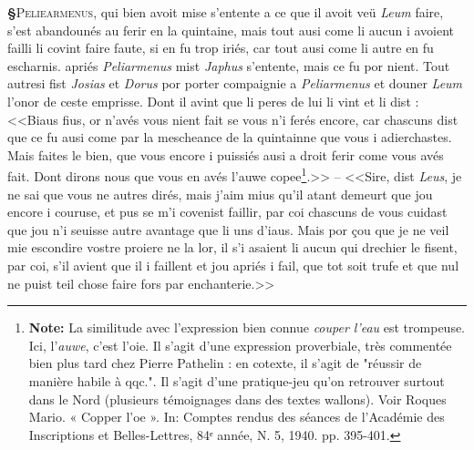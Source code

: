 \documentclass[12pt]{article} %
\newcommand{\persName}[1]{\emph{#1}} %
\newcommand{\supplied}[1]{\textlangle#1\textrangle} %
\newcommand{\fnnote}[1]{\footnote{\textbf{Note:} #1}} %
\newcounter{paranum}
\newcommand{\pnum}{\stepcounter{paranum}\textbf{§\arabic{paranum}}\quad}
\begin{document}
\pnum \lettrine[lines=3]{\color{darkblue}P}{eliearmenus}, qui bien avoit mise s'entente a ce que il avoit veü \persName{Leum} faire, s'est abandounés au ferir en la quintaine, mais tout ausi come li aucun i avoient failli li covint faire faute, si en fu trop iriés, car tout ausi come li autre en fu escharnis. apriés \persName{Peliarmenus} mist \persName{Japhus} s'entente, mais ce fu por nient. Tout autresi fist \persName{Josias} et \persName{Dorus} por porter compaignie a \persName{Peliarmenus} et douner \persName{Leum} l'onor de ceste emprisse. Dont il avint que li peres de lui li vint et li dist : <<Biaus fius, or n'avés vous nient fait se vous n'i ferés encore, car chascu\supplied{n}s dist que ce fu ausi come par la mescheance de la quintainne que vous i adierchastes. Mais faites le bien, que vous encore i puissiés ausi a droit ferir come vous avés fait. Dont dirons nous que vous en avés l'auwe copee\fnnote{La similitude avec l'expression bien connue \textit{couper l'eau} est trompeuse. Ici, l'\textit{auwe}, c'est l'oie. Il s'agit d'une expression proverbiale, très commentée bien plus tard chez Pierre Pathelin : en cotexte, il s'agit de "réussir de manière habile à qqc.". Il s'agit d'une pratique-jeu qu'on retrouver surtout dans le Nord (plusieurs témoignages dans des textes wallons). Voir Roques Mario. « Copper l'oe ». In: Comptes rendus des séances de l'Académie des Inscriptions et Belles-Lettres, 84ᵉ année, N. 5, 1940. pp. 395-401.}.>> -- <<Sire, dist \persName{Leus}, je ne sai que vous ne autres dirés, mais j'aim mius qu'il atant demeurt que jou encore i couruse, et pus se m'i covenist faillir, par coi chascuns de vous cuidast que jou n'i seuisse autre avantage que li uns d'iaus. Mais por çou que je ne veil mie escondire vostre proiere ne la lor, il s'i asaient li aucun qui drechier le fisent, par coi, s'il avient que il i faillent et jou apriés i fail, que tot soit trufe et que nul ne puist teil chose faire fors par enchanterie.>>
\end{document}
